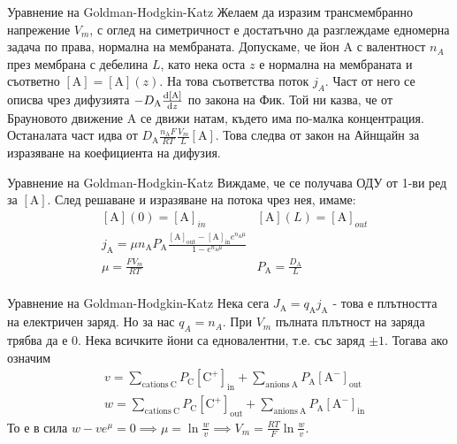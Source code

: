 \begin{frame}[t]{Уравнение на Goldman-Hodgkin-Katz}
  Желаем да изразим трансмембранно напрежение $V_m$, с оглед на симетричност е достатъчно да разглеждаме едномерна задача по права, нормална на мембраната.
  Допускаме, че йон $\mathrm{A}$ с валентност $n_A$ през мембрана с дебелина $L$, като нека оста $z$ е нормална на мембраната и съответно $\left[\mathrm{A}\right]=\left[\mathrm{A}\right](z)$.
  На това съответства поток $j_A$. Част от него се описва чрез дифузията $-D_{\mathrm{A}}\dv{\left[{\mathrm{A}}\right]}{z}$ по закона на Фик.
  Той ни казва, че от Брауновото движение $\mathrm{A}$ се движи натам, където има по-малка концентрация.
  Останалата част идва от $D_{\mathrm{A}}\frac{n_{\mathrm{A}}F}{RT}\frac{V_m}{L}\left[\mathrm{A}\right]$.
  Това следва от закон на Айнщайн за изразяване на коефициента на дифузия.
  \end{frame}

\begin{frame}[t]{Уравнение на Goldman-Hodgkin-Katz}
  Виждаме, че се получава ОДУ от 1-ви ред за $\left[\mathrm{A}\right]$. След решаване и изразяване на потока чрез нея, имаме:
  \begin{align*}
    &\left[\mathrm{A}\right](0) = \left[\mathrm{A}\right]_{in} &\left[\mathrm{A}\right](L) = \left[\mathrm{A}\right]_{out} \\
    &j_{\mathrm {A}}=\mu n_{\mathrm {A}}P_{\mathrm{A}}{\frac{\left[\mathrm{A}\right]_{\mathrm {out}}-\left[\mathrm {A}\right]_{\mathrm{in}}e^{n_{\mathrm {A}}\mu}}{1-e^{n_{\mathrm {A}}\mu}}} \\
    &\mu=\frac{FV_m}{RT} &P_{\mathrm{A}}=\frac{D_{\mathrm {A}}}{L}\\
  \end{align*}
\end{frame}

\begin{frame}[t]{Уравнение на Goldman-Hodgkin-Katz}
  Нека сега $J_{\mathrm{A}}=q_{\mathrm{A}}j_{\mathrm{A}}$ - това е плътността на електричен заряд. Но за нас $q_A = n_A$.
  При $V_m$ пълната плътност на заряда трябва да е 0.
  Нека всичките йони са едновалентни, т.е. със заряд $\pm 1$. Тогава ако означим
  \begin{align*}
    &v=\sum_{{{\mathrm{cations\ C}}}}P_{{{\mathrm{C}}}}\left[{\mathrm{C}}^{{+}}\right]_{{{\mathrm{in}}}}+\sum_{{{\mathrm{anions\ A}}}}P_{{{\mathrm{A}}}}\left[{\mathrm{A}}^{{-}}\right]_{{{\mathrm{out}}}} \\
    &w=\sum_{{{\mathrm{cations\ C}}}}P_{{{\mathrm{C}}}}\left[{\mathrm{C}}^{{+}}\right]_{{{\mathrm{out}}}}+\sum_{{{\mathrm{anions\ A}}}}P_{{{\mathrm{A}}}}\left[{\mathrm{A}}^{{-}}\right]_{{{\mathrm{in}}}}
  \end{align*}
  То е в сила $w - v e^\mu = 0 \implies \mu = \ln \frac{w}{v} \implies V_m = \frac{RT}{F} \ln \frac{w}{v}$.
\end{frame}
